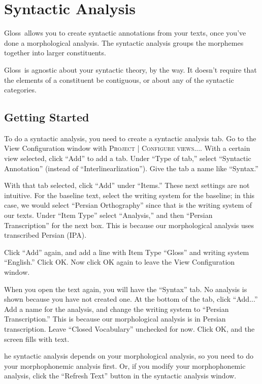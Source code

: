 \documentclass[oneside]{book}
\def\menu#1{\textsc{#1}}
\def\menu#1#2{\textsc{#1 | #2}}
\def\gloss{\textsf{Gloss}}
\def\tip#1\par{\medskip\noindent\fcolorbox{black}{light-gray}{\parbox{\textwidth}{#1}}\par\medskip}
\begin{document}
\section{Syntactic Analysis}
\gloss\ allows you to create syntactic annotations from your texts, once you've done a morphological analysis. The syntactic analysis groups the morphemes together into larger constituents.

\gloss\ is agnostic about your syntactic theory, by the way. It doesn't require that the elements of a constituent be contiguous, or about any of the syntactic categories.

\subsection{Getting Started}
To do a syntactic analysis, you need to create a syntactic analysis tab. Go to the View Configuration window with \menu{Project}{Configure views...}. With a certain view selected, click ``Add'' to add a tab. Under ``Type of tab,'' select ``Syntactic Annotation'' (instead of ``Interlinearlization''). Give the tab a name like ``Syntax.''

With that tab selected, click ``Add'' under ``Items.'' These next settings are not intuitive. For the baseline text, select the writing system for the baseline; in this case, we would select ``Persian Orthography'' since that is the writing system of our texts. Under ``Item Type'' select ``Analysis,'' and then ``Persian Transcription'' for the next box. This is because our morphological analysis uses transcribed Persian (IPA).

Click ``Add'' again, and add a line with Item Type ``Gloss'' and writing system ``English.'' Click OK. Now click OK again to leave the View Configuration window.

When you open the text again, you will have the ``Syntax'' tab. No analysis is shown because you have not created one. At the bottom of the tab, click ``Add...'' Add a name for the analysis, and change the writing system to ``Persian Transcription.'' This is because our morphological analysis is in Persian transcription. Leave ``Closed Vocabulary'' unchecked for now. Click OK, and the screen fills with text.

\tip The syntactic analysis depends on your morphological analysis, so you need to do your morphophonemic analysis first. Or, if you modify your morphophonemic analysis, click the ``Refresh Text'' button in the syntactic analysis window.
\end{document}
